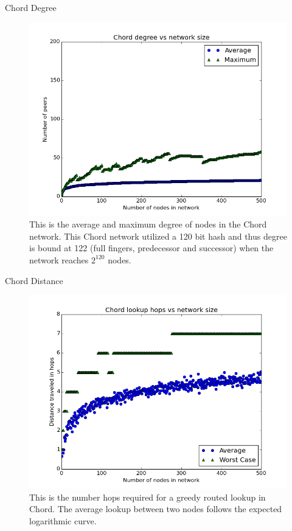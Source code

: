 \documentclass[11pt]{beamer}
\begin{document}
\begin{frame}{Chord Degree}
\begin{figure}
	\centering
	\includegraphics[width=0.7\linewidth]{figs/ChordDegree}
	\caption[Degree of nodes in Chord]{This is the average and maximum degree of nodes in the Chord network. This Chord network utilized a 120 bit hash and thus degree is bound at 122 (full fingers, predecessor and successor) when the network reaches $2^{120}$ nodes.}
	\label{fig:ChordDegree}
\end{figure}

\end{frame}

\begin{frame}{Chord Distance}
\begin{figure}
	\centering
	\includegraphics[width=0.7\linewidth]{figs/ChordDistance}
	\caption[Chord hops]{This is the number hops required for a greedy routed lookup in Chord. The average lookup between two nodes follows the expected logarithmic curve.}
	\label{fig:ChordDistance}
\end{figure}
\end{frame}
\end{document}
